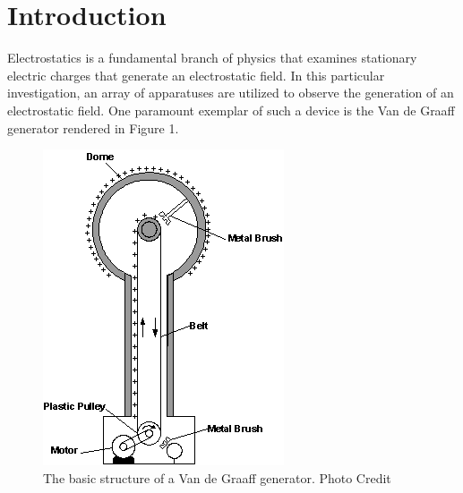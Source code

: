 \documentclass[12pt]{amsart}
\begin{document}
\section{Introduction}
Electrostatics is a fundamental branch of physics that examines stationary electric charges that generate an electrostatic field. In this particular investigation, an array of apparatuses are utilized to observe the generation of an electrostatic field. One paramount exemplar of such a device is the Van de Graaff generator rendered in Figure 1.\\
\begin{figure}[h]
	\includegraphics[width=\smallgraph,scale=0.01]{Van.png}
	\caption{The basic structure of a Van de Graaff generator. Photo Credit  \cite{Vander}}
	\label{Van}
\end{figure}
\end{document}

